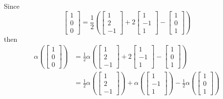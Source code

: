 \documentclass{article}
\begin{document}
\begin{solution}
Since
\[ 
\begin{bmatrix}
1\\
0\\
0
\end{bmatrix}
=
\frac{1}{2}
\left(
\begin{bmatrix}
1\\
2\\
-1
\end{bmatrix}
+2
\begin{bmatrix}
1\\
-1\\
1
\end{bmatrix}
-
\begin{bmatrix}
1\\
0\\
1
\end{bmatrix}
\right)
\]
then
\begin{align*}
\alpha 
\left(\begin{bmatrix}
1\\
0\\
0
\end{bmatrix}\right)
&=
\frac{1}{2}
\alpha
\left(
\begin{bmatrix}
1\\
2\\
-1
\end{bmatrix}
+2
\begin{bmatrix}
1\\
-1\\
1
\end{bmatrix}
-
\begin{bmatrix}
1\\
0\\
1
\end{bmatrix}
\right)\\
&= \frac{1}{2}
\alpha
\left(
\begin{bmatrix}
1\\
2\\
-1
\end{bmatrix}
\right)
+\alpha\left(
\begin{bmatrix}
1\\
-1\\
1
\end{bmatrix}
\right)
-\frac{1}{2}\alpha\left(
\begin{bmatrix}
1\\
0\\
1
\end{bmatrix}
\right)\\

\end{align*}
\end{solution}
\end{document}
